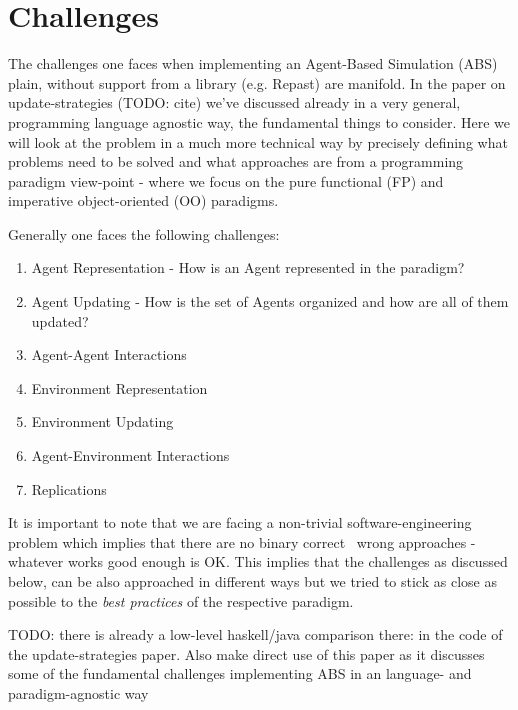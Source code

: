 \section{Challenges}
The challenges one faces when implementing an Agent-Based Simulation (ABS) plain, without support from a library (e.g. Repast) are manifold. In the paper on update-strategies (TODO: cite) we've discussed already in a very general, programming language agnostic way, the fundamental things to consider. Here we will look at the problem in a much more technical way by precisely defining what problems need to be solved and what approaches are from a programming paradigm view-point - where we focus on the pure functional (FP) and imperative object-oriented (OO) paradigms.

Generally one faces the following challenges:

\begin{enumerate}
	\item Agent Representation - How is an Agent represented in the paradigm?
	\item Agent Updating - How is the set of Agents organized and how are all of them updated?
	\item Agent-Agent Interactions 
	\item Environment Representation
	\item Environment Updating
	\item Agent-Environment Interactions
	\item Replications
\end{enumerate}

It is important to note that we are facing a non-trivial software-engineering problem which implies that there are no binary correct \ wrong approaches - whatever works good enough is OK. This implies that the challenges as discussed below, can be also approached in different ways but we tried to stick as close as possible to the \textit{best practices} of the respective paradigm.

TODO: there is already a low-level haskell/java comparison there: in the code of the update-strategies paper. Also make direct use of this paper as it discusses some of the fundamental challenges implementing ABS in an language- and paradigm-agnostic way
